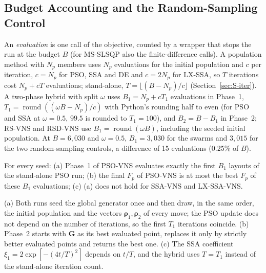 \subsection{Budget Accounting and the Random-Sampling Control}
\label{sec:S-th-budget}
An \emph{evaluation} is one call of the objective, counted by a wrapper that stops the run at the budget $B$ (for MS-SLSQP also the finite-difference calls). A population method with $N_p$ members uses $N_p$ evaluations for the initial population and $c$ per iteration, $c=N_p$ for PSO, SSA and DE and $c=2N_p$ for LX-SSA, so $T$ iterations cost $N_p+cT$ evaluations; stand-alone, $T=\lfloor(B-N_p)/c\rfloor$ (Section~\ref{sec:S-iter}). A two-phase hybrid with split $\omega$ uses $B_1=N_p+cT_1$ evaluations in Phase~1, $T_1=\operatorname{round}((\omega B-N_p)/c)$ with Python's rounding half to even (for PSO and SSA at $\omega=0.5$, $99.5$ is rounded to $T_1=100$), and $B_2=B-B_1$ in Phase~2; RS-VNS and RSD-VNS use $B_1=\operatorname{round}(\omega B)$, including the seeded initial population. At $B=6{,}030$ and $\omega=0.5$, $B_1=3{,}030$ for the swarms and $3{,}015$ for the two random-sampling controls, a difference of 15 evaluations (0.25\% of $B$).

\begin{thS}
\label{prop:S-prefix}
For every seed: (a) Phase~1 of PSO-VNS evaluates exactly the first $B_1$ layouts of the stand-alone PSO run; (b) the final $F_p$ of PSO-VNS is at most the best $F_p$ of these $B_1$ evaluations; (c) (a) does not hold for SSA-VNS and LX-SSA-VNS.
\end{thS}
\begin{thSproof}
(a) Both runs seed the global generator once and then draw, in the same order, the initial population and the vectors $\boldsymbol\rho_1,\boldsymbol\rho_2$ of every move; the PSO update does not depend on the number of iterations, so the first $T_1$ iterations coincide. (b) Phase~2 starts with $\mathbf G$ as its best evaluated point, replaces it only by strictly better evaluated points and returns the best one. (c) The SSA coefficient $\xi_1=2\exp[-(4t/T)^2]$ depends on $t/T$, and the hybrid uses $T=T_1$ instead of the stand-alone iteration count.
\end{thSproof}

